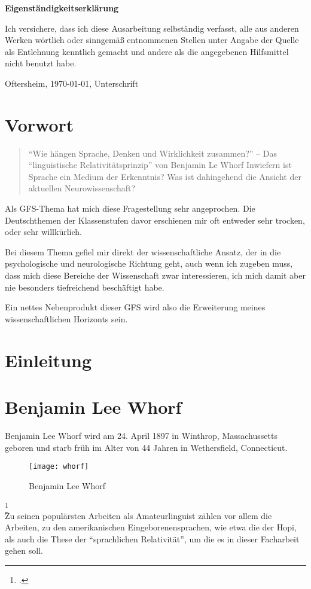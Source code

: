 \documentclass[12pt]{scrreprt}
\begin{document}
\makeititle
\begin{center}
	\sffamily\bfseries{Eigenständigkeitserklärung}
\end{center}
Ich versichere, dass ich diese Ausarbeitung selbständig verfasst, alle aus
anderen Werken wörtlich oder sinngemäß entnommenen Stellen unter Angabe der
Quelle als Entlehnung kenntlich gemacht und andere als die angegebenen
Hilfsmittel nicht benutzt habe.

Oftersheim, \today, Unterschrift
\tableofcontents
\listoffigures
\listoftables
\chapter{Vorwort}
	\label{chap:vorwort}
\blockquote{
\enquote{Wie hängen Sprache, Denken und Wirklichkeit
zusammen?} – Das \enquote{linguistische Relativitätsprinzip} von Benjamin Le
Whorf
\medskip\newline
Inwiefern ist Sprache ein Medium der Erkenntnis?
Was ist dahingehend die Ansicht der aktuellen Neurowissenschaft?}
Als GFS-Thema hat mich diese Fragestellung sehr angeprochen.
Die Deutschthemen der Klassenstufen davor erschienen mir oft entweder sehr
trocken, oder sehr willkürlich.

Bei diesem Thema gefiel mir direkt der wissenschaftliche Ansatz, der in die
psychologische und neurologische Richtung geht, auch wenn ich zugeben muss, dass
mich diese Bereiche der Wissenschaft zwar interessieren, ich mich damit aber nie
besonders tiefreichend beschäftigt habe.

Ein nettes Nebenprodukt dieser GFS wird also die Erweiterung meines
wissenschaftlichen Horizonts sein.
\chapter{Einleitung}
\label{chap:einleitung}

\chapter{Benjamin Lee Whorf}
\label{chap:bjwhorf}
Benjamin Lee Whorf wird am 24. April 1897 in Winthrop, Massachussetts geboren
und starb früh im Alter von 44 Jahren in Wethersfield, Connecticut.
\begin{figure}[!htb]
	\centering
	\texttt{[image: whorf]}
	\caption[Benjamin Lee Whorf {\autocite{image:B_L_Whorf}}]{Benjamin Lee Whorf\footnotemark}
	\label{fig:whorf}
\end{figure}
\footcitetext{image:B_L_Whorf}\\
Zu seinen populärsten Arbeiten als Amateurlinguist zählen vor allem die Arbeiten,
zu den amerikanischen Eingeborenensprachen, wie etwa die der Hopi, als auch die
These der \enquote{sprachlichen Relativität}, um die es in dieser Facharbeit
gehen soll.
\end{document}
